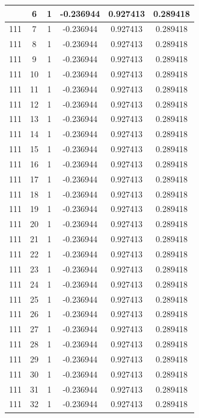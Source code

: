 \documentclass[12pt,a4paper]{article}
\numberwithin{equation}{section}
\numberwithin{figure}{section}
\numberwithin{table}{section}
\begin{document}
\begin{longtable}{|c|c|c|c|c|c|}
\pagebreak
111 & 6 & 1 & -0.236944 & 0.927413 & 0.289418 \\ \hline
111 & 7 & 1 & -0.236944 & 0.927413 & 0.289418 \\ \hline
111 & 8 & 1 & -0.236944 & 0.927413 & 0.289418 \\ \hline
111 & 9 & 1 & -0.236944 & 0.927413 & 0.289418 \\ \hline
111 & 10 & 1 & -0.236944 & 0.927413 & 0.289418 \\ \hline
111 & 11 & 1 & -0.236944 & 0.927413 & 0.289418 \\ \hline
111 & 12 & 1 & -0.236944 & 0.927413 & 0.289418 \\ \hline
111 & 13 & 1 & -0.236944 & 0.927413 & 0.289418 \\ \hline
111 & 14 & 1 & -0.236944 & 0.927413 & 0.289418 \\ \hline
111 & 15 & 1 & -0.236944 & 0.927413 & 0.289418 \\ \hline
111 & 16 & 1 & -0.236944 & 0.927413 & 0.289418 \\ \hline
111 & 17 & 1 & -0.236944 & 0.927413 & 0.289418 \\ \hline
111 & 18 & 1 & -0.236944 & 0.927413 & 0.289418 \\ \hline
111 & 19 & 1 & -0.236944 & 0.927413 & 0.289418 \\ \hline
111 & 20 & 1 & -0.236944 & 0.927413 & 0.289418 \\ \hline
111 & 21 & 1 & -0.236944 & 0.927413 & 0.289418 \\ \hline
111 & 22 & 1 & -0.236944 & 0.927413 & 0.289418 \\ \hline
111 & 23 & 1 & -0.236944 & 0.927413 & 0.289418 \\ \hline
111 & 24 & 1 & -0.236944 & 0.927413 & 0.289418 \\ \hline
111 & 25 & 1 & -0.236944 & 0.927413 & 0.289418 \\ \hline
111 & 26 & 1 & -0.236944 & 0.927413 & 0.289418 \\ \hline
111 & 27 & 1 & -0.236944 & 0.927413 & 0.289418 \\ \hline
111 & 28 & 1 & -0.236944 & 0.927413 & 0.289418 \\ \hline
111 & 29 & 1 & -0.236944 & 0.927413 & 0.289418 \\ \hline
111 & 30 & 1 & -0.236944 & 0.927413 & 0.289418 \\ \hline
111 & 31 & 1 & -0.236944 & 0.927413 & 0.289418 \\ \hline
111 & 32 & 1 & -0.236944 & 0.927413 & 0.289418 \\ \hline

\end{longtable}
\end{document}
